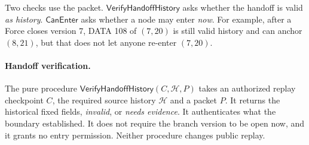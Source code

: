 \documentclass[11pt,a4paper]{article}
\newcommand{\tagg}[1]{\ensuremath{\mathsf{#1}}}
\begin{document}
Two checks use the packet. \tagg{VerifyHandoffHistory} asks whether the
handoff is valid \emph{as history}. \tagg{CanEnter} asks whether a node
may enter \emph{now}. For example, after a Force closes version 7, DATA
108 of $(7,20)$ is still valid history and can anchor $(8,21)$, but that
does not let anyone re-enter $(7,20)$.

\paragraph{Handoff verification.}
\label{sec:verify-handoff}
The pure procedure $\tagg{VerifyHandoffHistory}(C,\mathcal H,P)$ takes an
authorized replay checkpoint $C$, the required source history $\mathcal H$
and a packet $P$. It returns the historical fixed fields, \emph{invalid},
or \emph{needs evidence}. It authenticates what the boundary established.
It does not require the branch version to be open now, and it grants no
entry permission. Neither procedure changes public replay.
\end{document}
